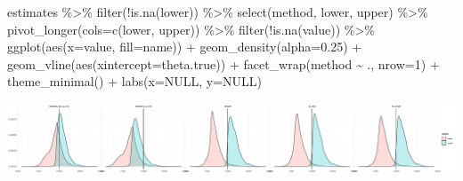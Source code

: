 \documentclass[
]{article}
\newenvironment{Shaded}{\begin{snugshade}}{\end{snugshade}}
\newcommand{\AttributeTok}[1]{\textcolor[rgb]{0.77,0.63,0.00}{#1}}
\newcommand{\ConstantTok}[1]{\textcolor[rgb]{0.00,0.00,0.00}{#1}}
\newcommand{\DecValTok}[1]{\textcolor[rgb]{0.00,0.00,0.81}{#1}}
\newcommand{\FloatTok}[1]{\textcolor[rgb]{0.00,0.00,0.81}{#1}}
\newcommand{\FunctionTok}[1]{\textcolor[rgb]{0.00,0.00,0.00}{#1}}
\newcommand{\NormalTok}[1]{#1}
\newcommand{\SpecialCharTok}[1]{\textcolor[rgb]{0.00,0.00,0.00}{#1}}
\begin{document}
\begin{Shaded}
\begin{Highlighting}[]
\NormalTok{estimates }\SpecialCharTok{\%\textgreater{}\%}
  \FunctionTok{filter}\NormalTok{(}\SpecialCharTok{!}\FunctionTok{is.na}\NormalTok{(lower)) }\SpecialCharTok{\%\textgreater{}\%}
  \FunctionTok{select}\NormalTok{(method, lower, upper) }\SpecialCharTok{\%\textgreater{}\%}
  \FunctionTok{pivot\_longer}\NormalTok{(}\AttributeTok{cols=}\FunctionTok{c}\NormalTok{(lower, upper)) }\SpecialCharTok{\%\textgreater{}\%}
  \FunctionTok{filter}\NormalTok{(}\SpecialCharTok{!}\FunctionTok{is.na}\NormalTok{(value)) }\SpecialCharTok{\%\textgreater{}\%}
  \FunctionTok{ggplot}\NormalTok{(}\FunctionTok{aes}\NormalTok{(}\AttributeTok{x=}\NormalTok{value, }\AttributeTok{fill=}\NormalTok{name)) }\SpecialCharTok{+}
  \FunctionTok{geom\_density}\NormalTok{(}\AttributeTok{alpha=}\FloatTok{0.25}\NormalTok{) }\SpecialCharTok{+}
  \FunctionTok{geom\_vline}\NormalTok{(}\FunctionTok{aes}\NormalTok{(}\AttributeTok{xintercept=}\NormalTok{theta.true)) }\SpecialCharTok{+}
  \FunctionTok{facet\_wrap}\NormalTok{(method }\SpecialCharTok{\textasciitilde{}}\NormalTok{ ., }\AttributeTok{nrow=}\DecValTok{1}\NormalTok{) }\SpecialCharTok{+}
  \FunctionTok{theme\_minimal}\NormalTok{() }\SpecialCharTok{+}
  \FunctionTok{labs}\NormalTok{(}\AttributeTok{x=}\ConstantTok{NULL}\NormalTok{, }\AttributeTok{y=}\ConstantTok{NULL}\NormalTok{)}
\end{Highlighting}
\end{Shaded}

\includegraphics{sim_exp-results_files/figure-latex/unnamed-chunk-11-1.pdf}
\end{document}
